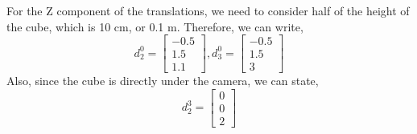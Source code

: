 \documentclass[conference]{IEEEtran}
\begin{document}
For the Z component of the translations, we need to consider half of the height
of the cube, which is 10 cm, or 0.1 m. Therefore, we can write,
\[
    d^0_2 = \begin{bmatrix}
        -0.5\\
        1.5\\
        1.1
    \end{bmatrix},
    d^0_3 = \begin{bmatrix}
        -0.5\\
        1.5\\
        3
    \end{bmatrix}
\]
Also, since the cube is directly under the camera, we can state,
\[
    d^3_2 = \begin{bmatrix}
        0\\
        0\\
        2
    \end{bmatrix}
\]
\vspace{0.1in}
\end{document}
